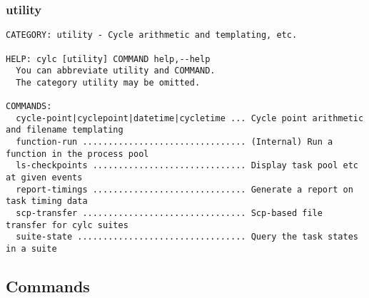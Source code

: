 \subsubsection{utility}
\label{utility}
\begin{lstlisting}
CATEGORY: utility - Cycle arithmetic and templating, etc.

HELP: cylc [utility] COMMAND help,--help
  You can abbreviate utility and COMMAND.
  The category utility may be omitted.

COMMANDS:
  cycle-point|cyclepoint|datetime|cycletime ... Cycle point arithmetic and filename templating
  function-run ................................ (Internal) Run a function in the process pool
  ls-checkpoints .............................. Display task pool etc at given events
  report-timings .............................. Generate a report on task timing data
  scp-transfer ................................ Scp-based file transfer for cylc suites
  suite-state ................................. Query the task states in a suite
\end{lstlisting}
\subsection{Commands}
